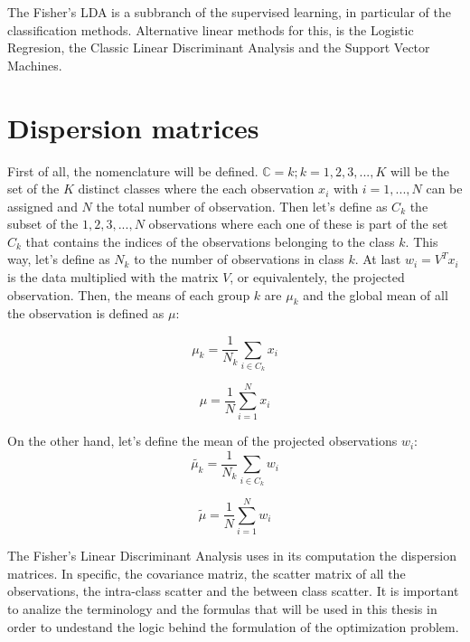 The Fisher's LDA is a subbranch of the supervised learning, in particular of the classification methods. Alternative linear methods for this, is the Logistic Regresion, the Classic Linear Discriminant Analysis and the Support Vector Machines.


\section{Dispersion matrices}
First of all, the nomenclature will be defined. $\mathbb{C} = {k; k = 1, 2, 3, ..., K}$ will be the set of the $K$ distinct classes where the each observation $x_i$ with $i = 1, ..., N$ can be assigned and $N$ the total number of observation. Then let's define as $C_k$ the subset of the ${1, 2, 3, ..., N}$ observations where each one of these is part of the set $C_k$ that contains the indices of the observations belonging to the class $k$. This way, let's define as $N_{k}$ to the number of observations in class $k$. At last $w_i = V^T x_i$ is the data multiplied with the matrix $V$, or equivalentely, the projected observation. Then, the means of each group $k$ are $\mu_k$ and the global mean of all the observation is defined as $\mu$:

\begin{equation} \label{eq:18}
  \mu_k = \frac{1}{N_{k}} 
  \sum_{i  \in C_k}
                  x_i
\end{equation} 

\begin{equation} \label{eq:19}
 \mu = \frac{1}{N} \sum_{i = 1}^{N} x_i
\end{equation}

On the other hand, let's define the mean of the projected observations $w_i$:
\begin{equation} \label{eq:20}
  \widetilde{\mu_k} = \frac{1}{N_{k}} 
  \sum_{i \in C_k}
                  w_i
\end{equation} 

\begin{equation} \label{eq:21}
 \widetilde{\mu} = \frac{1}{N} \sum_{i = 1}^{N} w_i
\end{equation}

The Fisher's Linear Discriminant Analysis uses in its computation the dispersion matrices. In specific, the covariance matriz, the scatter matrix of all the observations, the intra-class scatter and the between class scatter. It is important to analize the terminology and the formulas that will be used in this thesis in order to undestand the logic behind the formulation of the optimization problem.

